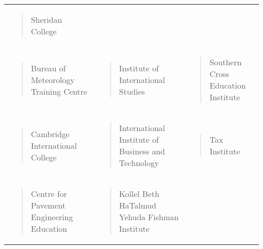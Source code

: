 \documentclass[]{book}
\begin{document}
\begin{longtable}[]{@{}lll@{}}
\begin{minipage}[t]{0.32\columnwidth}
\begin{quote}
Sheridan College
\end{quote}\strut
\end{minipage}\tabularnewline
\begin{minipage}[t]{0.32\columnwidth}\raggedright
\begin{quote}
Bureau of Meteorology Training Centre
\end{quote}\strut
\end{minipage} & \begin{minipage}[t]{0.32\columnwidth}\raggedright
\begin{quote}
Institute of International Studies
\end{quote}\strut
\end{minipage} & \begin{minipage}[t]{0.32\columnwidth}\raggedright
\begin{quote}
Southern Cross Education Institute
\end{quote}\strut
\end{minipage}\tabularnewline
\begin{minipage}[t]{0.32\columnwidth}\raggedright
\begin{quote}
Cambridge International College
\end{quote}\strut
\end{minipage} & \begin{minipage}[t]{0.32\columnwidth}\raggedright
\begin{quote}
International Institute of Business and Technology
\end{quote}\strut
\end{minipage} & \begin{minipage}[t]{0.32\columnwidth}\raggedright
\begin{quote}
Tax Institute
\end{quote}\strut
\end{minipage}\tabularnewline
\begin{minipage}[t]{0.32\columnwidth}\raggedright
\begin{quote}
Centre for Pavement Engineering Education
\end{quote}\strut
\end{minipage} & \begin{minipage}[t]{0.32\columnwidth}\raggedright
\begin{quote}
Kollel Beth HaTalmud Yehuda Fishman Institute
\end{quote}\strut
\end{minipage} & \begin{minipage}[t]{0.32\columnwidth}\raggedright

\end{minipage}
\end{longtable}
\end{document}
